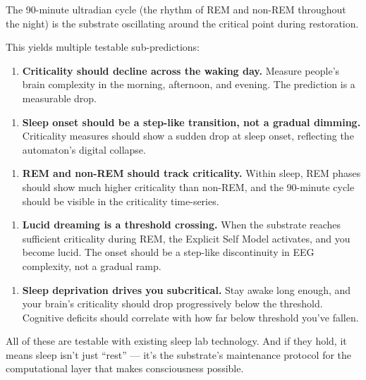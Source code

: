\documentclass[11pt, twoside, openright]{book}
\begin{document}
The 90-minute ultradian cycle (the rhythm of REM and non-REM throughout the night) is the substrate oscillating around the critical point during restoration.

This yields multiple testable sub-predictions:

\begin{enumerate}
  \item \textbf{Criticality should decline across the waking day.} Measure people's brain complexity in the morning, afternoon, and evening. The prediction is a measurable drop.
\end{enumerate}

\begin{enumerate}
  \item \textbf{Sleep onset should be a step-like transition, not a gradual dimming.} Criticality measures should show a sudden drop at sleep onset, reflecting the automaton's digital collapse.
\end{enumerate}

\begin{enumerate}
  \item \textbf{REM and non-REM should track criticality.} Within sleep, REM phases should show much higher criticality than non-REM, and the 90-minute cycle should be visible in the criticality time-series.
\end{enumerate}

\begin{enumerate}
  \item \textbf{Lucid dreaming is a threshold crossing.} When the substrate reaches sufficient criticality during REM, the Explicit Self Model activates, and you become lucid. The onset should be a step-like discontinuity in EEG complexity, not a gradual ramp.
\end{enumerate}

\begin{enumerate}
  \item \textbf{Sleep deprivation drives you subcritical.} Stay awake long enough, and your brain's criticality should drop progressively below the threshold. Cognitive deficits should correlate with how far below threshold you've fallen.
\end{enumerate}

All of these are testable with existing sleep lab technology. And if they hold, it means sleep isn't just ``rest'' --- it's the substrate's maintenance protocol for the computational layer that makes consciousness possible.
\end{document}
